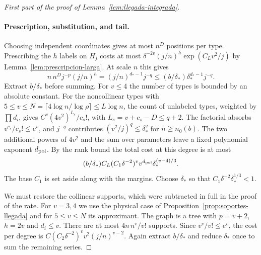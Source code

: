 \begin{proof}[First part of the proof of Lemma~\ref{lem:llegada-integrada}]
\paragraph{Prescription, substitution, and tail.}
Choosing independent coordinates gives at most \(n^D\) positions per type. Prescribing the \(h\) labels
on \(H_j\) costs at most \(\delta^{-2v}(j/n)^h\exp(C_Lv^2/j)\) by Lemma~\ref{lem:prescripcion-larga}. At
scale \(n\) this gives
\[
 n\,n^D j^{-p}(j/n)^h=(j/n)^{d_*-1}j^{-q}
 \le (b/\delta_*)\delta_*^{d_*-1}j^{-q}.
\]
Extract \(b/\delta_*\) before summing. For \(v\le4\) the number of types is bounded by an absolute
constant. For the noncollinear types with \(5\le v\le N=\lceil4\log n/\log\rho\rceil\le L\log n\), the
count of unlabeled types, weighted by \(\prod d_i\), gives \(C^v(4v^2)^{L_s}/c_s!\), with
\(L_s=v+c_s-D\le q+2\). The factorial absorbs \(v^{c_s}/c_s!\le e^v\), and \(j^{-q}\) contributes
\((v^2/j)^q\le\delta_*^q\) for \(n\ge n_0(b)\). The two additional powers of \(4v^2\) and the sum over
parameters leave a fixed polynomial exponent \(d_{\rm pol}\). By the rank bound the total cost at this
degree is at most
\[
 (b/\delta_*) C_L (C_1\delta^{-2})^v v^{d_{\rm pol}}\delta_*^{(v-4)/3}.
\]
The base \(C_1\) is set aside along with the margins. Choose \(\delta_*\) so that
\(C_1\delta^{-2}\delta_*^{1/3}<1\).

We must restore the collinear supports, which were subtracted in full in the proof of the rate. For
\(v=3,4\) we use the physical case of Proposition~\ref{prop:soportes-llegada} and for \(5\le v\le N\) its
approximant. The graph is a tree with \(p=v+2\), \(h=2v\) and \(d_i\le v\). There are at most
\(4n\,n^v/v!\) supports. Since \(v^v/v!\le e^v\), the cost per degree is \(C(C_2\delta^{-2})^v
v^2(j/n)^{v-2}\). Again extract \(b/\delta_*\) and reduce \(\delta_*\) once to sum the remaining series.


\end{proof}
